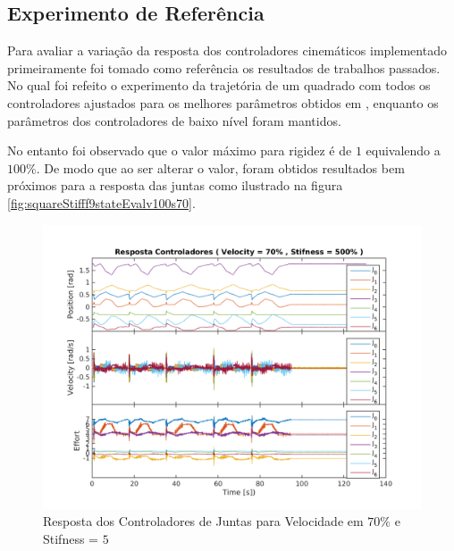 \subsection{Experimento de Referência}

Para avaliar a variação da resposta dos controladores cinemáticos implementado primeiramente foi tomado como referência os resultados de trabalhos passados. No qual foi refeito o experimento da trajetória de um quadrado com todos os controladores ajustados para os melhores parâmetros obtidos em \cite{marcosps2016}, enquanto os parâmetros dos controladores de baixo nível foram mantidos.

No entanto foi observado que o valor máximo para rigidez é de $1$ equivalendo a $100\%$. De modo que ao ser alterar o valor, foram obtidos resultados bem próximos para a resposta das juntas como ilustrado na figura \ref{fig:squareStifff9stateEvalv100s70}.

\begin{figure}[H]
    \centering
    \includegraphics[width=0.8\linewidth,trim={2cm 1cm 2cm 2cm}]{tex/figs/squareStifff4stateEvalv70s500.png}
    \caption{Resposta dos Controladores de Juntas para Velocidade em $70\%$ e Stifness = $5$ }
    \label{fig:squareStiffMarcos}
\end{figure}

\vspace{1cm}

